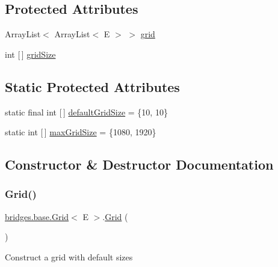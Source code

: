 \subsection*{Protected Attributes}
\begin{DoxyCompactItemize}
\item 
Array\+List$<$ Array\+List$<$ E $>$ $>$ \mbox{\hyperlink{classbridges_1_1base_1_1_grid_ad1f3f6968d58188425bd992c05c655a6}{grid}}
\item 
int \mbox{[}$\,$\mbox{]} \mbox{\hyperlink{classbridges_1_1base_1_1_grid_a54a66479f78022570253d771206a0420}{grid\+Size}}
\end{DoxyCompactItemize}
\subsection*{Static Protected Attributes}
\begin{DoxyCompactItemize}
\item 
static final int \mbox{[}$\,$\mbox{]} \mbox{\hyperlink{classbridges_1_1base_1_1_grid_a45c2786d2af83624202192857a27724f}{default\+Grid\+Size}} = \{10, 10\}
\item 
static int \mbox{[}$\,$\mbox{]} \mbox{\hyperlink{classbridges_1_1base_1_1_grid_a803fd4c070a22863c82581f0bb258c1c}{max\+Grid\+Size}} = \{1080, 1920\}
\end{DoxyCompactItemize}


\subsection{Constructor \& Destructor Documentation}
\mbox{\label{classbridges_1_1base_1_1_grid_aa621ffc958db8341f7ce37ed78944d51}} 
\subsubsection{\texorpdfstring{Grid()}{Grid()}\hspace{0.1cm}{\footnotesize\ttfamily [1/4]}}
{\footnotesize\ttfamily \mbox{\hyperlink{classbridges_1_1base_1_1_grid}{bridges.\+base.\+Grid}}$<$ E $>$.\mbox{\hyperlink{classbridges_1_1base_1_1_grid}{Grid}} (\begin{DoxyParamCaption}{ }\end{DoxyParamCaption})}

Construct a grid with default sizes \mbox{\label{classbridges_1_1base_1_1_grid_a9818d4959813f1292c6a234bc6f6aa9e}} 
